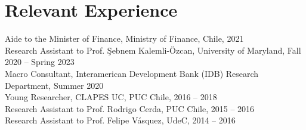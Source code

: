 \documentclass[10pt]{article}
\begin{document}

%
%
%





\section*{Relevant Experience}


Aide to the Minister of Finance, Ministry of Finance, Chile, 2021 \\
Research Assistant to Prof. \c{S}ebnem Kalemli-\"{O}zcan, University of Maryland, Fall 2020 -- Spring 2023\\
Macro Consultant, Interamerican Development Bank (IDB) Research Department, Summer 2020\\
Young Researcher, CLAPES UC, PUC Chile, 2016 -- 2018\\
Research Assistant to Prof. Rodrigo Cerda, PUC Chile, 2015 -- 2016\\
Research Assistant to Prof. Felipe V\'asquez, UdeC, 2014 -- 2016
\end{document}
